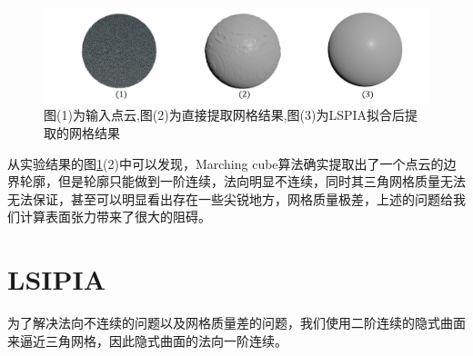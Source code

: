 \begin{figure}[htbp]
    \centering
    \includegraphics[scale=0.5]{./images/experience1.png}
    \caption{图(1)为输入点云,图(2)为直接提取网格结果,图(3)为LSPIA拟合后提取的网格结果}
    \label{fig: MarchingCube vs after LSPIA}
\end{figure}


从实验结果的图\ref{fig: MarchingCube vs after LSPIA}(2)中可以发现，Marching cube算法确实提取出了一个点云的边界轮廓，但是轮廓只能做到一阶连续，法向明显不连续，同时其三角网格质量无法
无法保证，甚至可以明显看出存在一些尖锐地方，网格质量极差，上述的问题给我们计算表面张力带来了很大的阻碍。

\section{LSIPIA}
为了解决法向不连续的问题以及网格质量差的问题，我们使用二阶连续的隐式曲面来逼近三角网格，因此隐式曲面的法向一阶连续。

